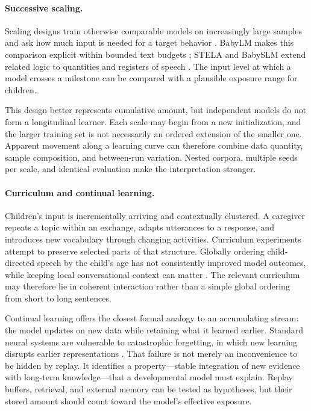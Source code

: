 \paragraph{Successive scaling.}
Scaling designs train otherwise comparable models on increasingly large samples and ask how much input is needed for a target behavior \citep{warstadt2020learning}. BabyLM makes this comparison explicit within bounded text budgets \citep{Warstadt2023,Hu2024}; STELA and BabySLM extend related logic to quantities and registers of speech \citep{Lavechin2023BabySLM,lavechin2024modeling}. The input level at which a model crosses a milestone can be compared with a plausible exposure range for children.

This design better represents cumulative amount, but independent models do not form a longitudinal learner. Each scale may begin from a new initialization, and the larger training set is not necessarily an ordered extension of the smaller one. Apparent movement along a learning curve can therefore combine data quantity, sample composition, and between-run variation. Nested corpora, multiple seeds per scale, and identical evaluation make the interpretation stronger.

\paragraph{Curriculum and continual learning.}
Children's input is incrementally arriving and contextually clustered. A caregiver repeats a topic within an exchange, adapts utterances to a response, and introduces new vocabulary through changing activities. Curriculum experiments attempt to preserve selected parts of that structure. Globally ordering child-directed speech by the child's age has not consistently improved model outcomes, while keeping local conversational context can matter \citep{feng2024child}. The relevant curriculum may therefore lie in coherent interaction rather than a simple global ordering from short to long sentences.

Continual learning offers the closest formal analogy to an accumulating stream: the model updates on new data while retaining what it learned earlier. Standard neural systems are vulnerable to catastrophic forgetting, in which new learning disrupts earlier representations \citep{mccloskey1989catastrophic}. That failure is not merely an inconvenience to be hidden by replay. It identifies a property---stable integration of new evidence with long-term knowledge---that a developmental model must explain. Replay buffers, retrieval, and external memory can be tested as hypotheses, but their stored amount should count toward the model's effective exposure.

